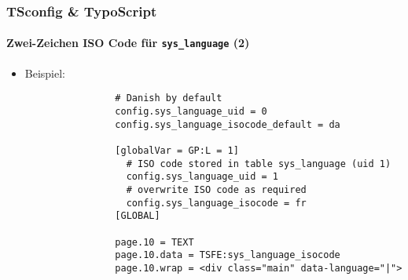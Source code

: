 \begin{frame}[fragile]
	\frametitle{TSconfig \& TypoScript}
	\framesubtitle{Zwei-Zeichen ISO Code für \texttt{sys\_language} (2)}

	\begin{itemize}
		\item Beispiel:

			\begin{lstlisting}
				# Danish by default
				config.sys_language_uid = 0
				config.sys_language_isocode_default = da

				[globalVar = GP:L = 1]
				  # ISO code stored in table sys_language (uid 1)
				  config.sys_language_uid = 1
				  # overwrite ISO code as required
				  config.sys_language_isocode = fr
				[GLOBAL]

				page.10 = TEXT
				page.10.data = TSFE:sys_language_isocode
				page.10.wrap = <div class="main" data-language="|">
			\end{lstlisting}

	\end{itemize}

\end{frame}


